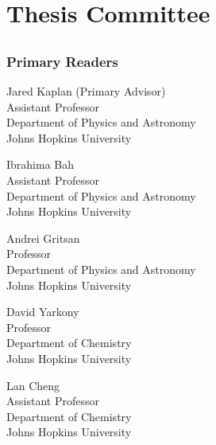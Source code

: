 \chapter*{Thesis Committee}

\section*{}
\subsection*{Primary Readers}

\begin{singlespace}


\indent Jared Kaplan (Primary Advisor)\\
\indent \indent Assistant Professor \\
\indent \indent Department of Physics and Astronomy\\
\indent \indent Johns Hopkins University \\


\smallskip 

\noindent Ibrahima Bah \\
\indent \indent Assistant Professor\\
\indent \indent Department of Physics and Astronomy\\
\indent \indent Johns Hopkins University \\

\smallskip 

\noindent Andrei Gritsan \\
\indent \indent Professor\\
\indent \indent Department of Physics and Astronomy \\
\indent \indent Johns Hopkins University \\

\smallskip

\noindent David Yarkony \\
\indent \indent Professor\\
\indent \indent Department of Chemistry \\
\indent \indent Johns Hopkins University \\

\smallskip

\noindent Lan Cheng \\
\indent \indent Assistant Professor\\
\indent \indent Department of Chemistry \\
\indent \indent Johns Hopkins University

\end{singlespace}
